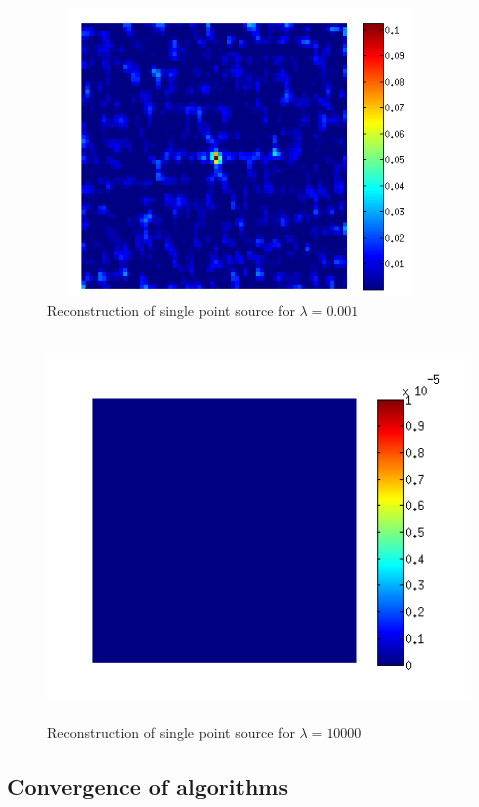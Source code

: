 \begin{figure}[!htbp]
  \begin{center}
      \includegraphics[width=4in,height=3in]{figures/spsn}
    \caption{Reconstruction of single point source for $\lambda = 0.001$}
    \label{Figsmalllam}
  \end{center}
\end{figure}

\begin{figure}[!htbp]
  \begin{center}
      \includegraphics[width=5in,height=4in]{figures/spss}
    \caption{Reconstruction of single point source  for $\lambda = 10000$}
    \label{Figlargelam}
  \end{center}
\end{figure}

\newpage
\subsection{Convergence of algorithms}
\label{s:discussion_convergence}

